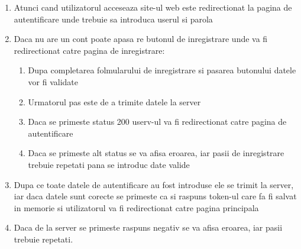 \begin{enumerate}
  	\item Atunci cand utilizatorul acceseaza site-ul web este redirectionat la pagina de autentificare unde trebuie sa introduca userul si parola
	\item Daca nu are un cont poate apasa re butonul de inregistrare unde va fi redirectionat catre pagina de inregistrare:
		\begin{enumerate}
		  	\item Dupa completarea folmularului de inregistrare si pasarea butonului datele vor fi validate
			\item Urmatorul pas este de a trimite datele la server
			\item Daca se primeste status 200 userv-ul va fi redirectionat catre pagina de autentificare
			\item Daca se primeste alt status se va afisa eroarea, iar pasii de inregistrare trebuie repetati pana se introduc date valide	
		\end{enumerate}
	\item Dupa ce toate datele de autentificare au fost introduse ele se trimit la server, iar daca datele sunt corecte se primeste ca si raspuns token-ul care fa fi salvat in memorie si utilizatorul va fi redirectionat catre pagina principala
	\item Daca de la server se primeste raspuns negativ se va afisa eroarea, iar pasii trebuie repetati.
\end{enumerate}